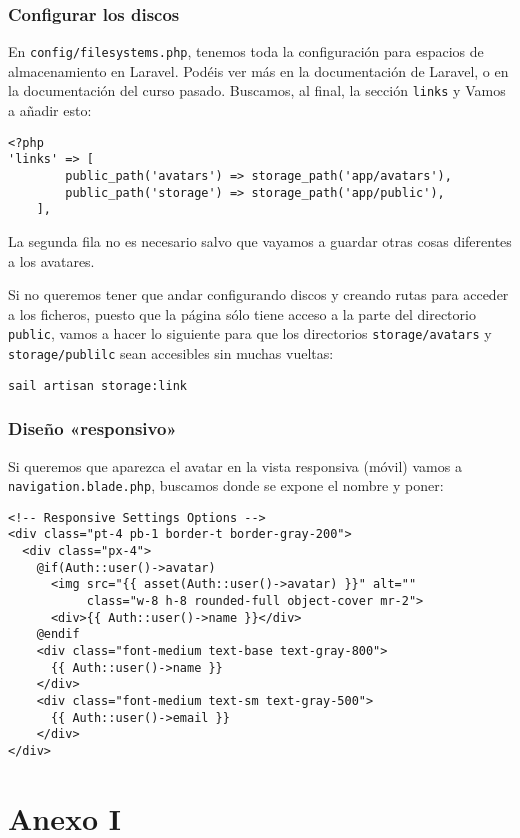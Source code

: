 \documentclass[11pt]{article}
\begin{document}
\subsubsection{Configurar los discos}
\label{sec:orgec3fd65}
En \texttt{config/filesystems.php}, tenemos toda la configuración para
espacios de almacenamiento en Laravel. Podéis ver más en la
documentación de Laravel, o en la documentación del curso pasado.
Buscamos, al final, la sección \texttt{links} y Vamos a añadir esto:
\begin{verbatim}
<?php
'links' => [
        public_path('avatars') => storage_path('app/avatars'),
        public_path('storage') => storage_path('app/public'),
    ],
\end{verbatim}
La segunda fila no es necesario salvo que vayamos a guardar otras
cosas diferentes a los avatares.

Si no queremos tener que andar configurando discos y creando rutas
para acceder a los ficheros, puesto que la página sólo tiene acceso a
la parte del directorio \texttt{public}, vamos a hacer lo siguiente para que
los directorios \texttt{storage/avatars} y \texttt{storage/publilc} sean accesibles
sin muchas vueltas:
\begin{verbatim}
sail artisan storage:link
\end{verbatim}

\subsubsection{Diseño «responsivo»}
\label{sec:orgac6aac7}
Si queremos que aparezca el avatar en la vista responsiva (móvil)
vamos a \texttt{navigation.blade.php}, buscamos donde se expone el nombre y
poner:
\begin{verbatim}
<!-- Responsive Settings Options -->
<div class="pt-4 pb-1 border-t border-gray-200">
  <div class="px-4">
    @if(Auth::user()->avatar)
      <img src="{{ asset(Auth::user()->avatar) }}" alt=""
           class="w-8 h-8 rounded-full object-cover mr-2">
      <div>{{ Auth::user()->name }}</div>
    @endif
    <div class="font-medium text-base text-gray-800">
      {{ Auth::user()->name }}
    </div>
    <div class="font-medium text-sm text-gray-500">
      {{ Auth::user()->email }}
    </div>
</div>
\end{verbatim}

\newpage


\section{Anexo I}
\label{sec:orgc9584b2}
\end{document}
